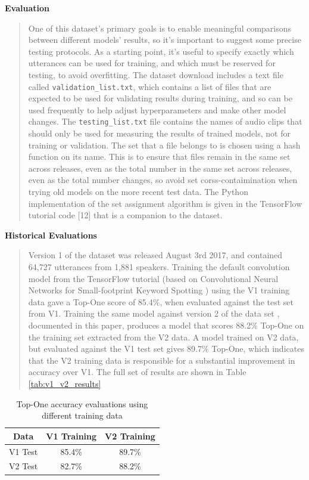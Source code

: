 \documentclass{article}
\theoremstyle{definition}
\theoremstyle{remark}
\begin{document}
\textbf{Evaluation}

\begin{quote}
One of this dataset's primary goals is to enable meaningful comparisons between different models' results, so it's important to suggest some precise testing protocols. As a starting point, it's useful to specify exactly which utterances can be used for training, and which must be reserved for testing, to avoid overfitting. The dataset download includes a text file called \texttt{validation\_list.txt}, which contains a list of files that are expected to be used for validating results during training, and so can be used frequently to help adjust hyperparameters and make other model changes. The \texttt{testing\_list.txt} file contains the names of audio clips that should only be used for measuring the results of trained models, not for training or validation. The set that a file belongs to is chosen using a hash function on its name. This is to ensure that files remain in the same set across releases, even as the total number in the same set across releases, even as the total number changes, so avoid set corss-contaimination when trying old models on the more recent test data. The Python implementation of the set assignment algorithm is given in the TensorFlow tutorial code [12] that is a companion to the dataset.
\end{quote}

\textbf{Historical Evaluations}

\begin{quote}
Version 1 of the dataset \cite{scd_v1} was released August 3rd 2017, and contained 64,727 utterances from 1,881 speakers. Training the default convolution model from the TensorFlow tutorial (based on Convolutional Neural Networks for Small-footprint Keyword Spotting \cite{sainath2015convolutional}) using the V1 training data gave a Top-One score of 85.4\%, when evaluated against the test set from V1. Training the same model against version 2 of the data set \cite{scd_v2}, documented in this paper, produces a model that scores 88.2\% Top-One on the training set extracted from the V2 data. A model trained on V2 data, but evaluated against the V1 test set gives 89.7\% Top-One, which indicates that the V2 training data is responsible for a substantial improvement in accuracy over V1. The full set of results are shown in Table \ref{tab:v1_v2_results}
\end{quote}


\begin{table}[]
\center
\begin{tabular}{|c|c|c|}
\hline
Data & V1 Training & V2 Training \\ \hline
V1 Test & 85.4\% & 89.7\% \\ \hline
V2 Test & 82.7\% & 88.2\% \\ \hline
\end{tabular}
\caption{Top-One accuracy evaluations using different training data}
\label{tab:top_one_accuracy}
\end{table}
\end{document}
